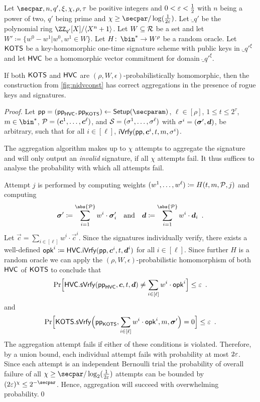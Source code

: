 \begin{lemma}\label{lem:msigaggcorrect}
Let $\secpar,n,q',\xi,\chi,\rho,\tau$ be positive integers and $0 < \varepsilon < \tfrac{1}{2}$ with $n$ being a power of two, $q'$ being prime and $\chi \geq \secpar/\log(\tfrac{1}{2\errorbound})$.
Let $\ring_{q'}$ be the polynomial ring $\defringqq$.
Let $W \subseteq \mathcal{R}$ be a set and let $W' \coloneqq \{w^0-w^1| w^0,w^1 \in W\}$.
Let $H\colon\, \bin^* \to W^\rho$ be a random oracle.
Let $\mathsf{KOTS}$ be a key-homomorphic one-time signature scheme with public keys in $\ring_{q'}^\xi$ and let $\mathsf{HVC}$ be a homomorphic vector commitment for domain $\ring_{q'}^\xi$.

If both $\mathsf{KOTS}$ and $\mathsf{HVC}$ are $(\rho,W,\epsilon)$-probabilistically homomorphic, then the construction from \autoref{fig:nidvconst} has correct aggregations in the presence of rogue keys and signatures.
\end{lemma}
\begin{proof}
  Let $\params = (\params_\hvc,\params_\hots)\gets\setup(\secparam)$, $\ell \in [\rho]$, $1\leq t\leq 2^\tau$, $m\in\bin^*$, $\mathcal{P} = (\boldsymbol{c}^1,\dots,\boldsymbol{c}^\ell)$, and $\mathcal{S} = (\sigma^1,\dots,\sigma^\ell)$ with 
  $\sigma^i=(\boldsymbol{\sigma}',\boldsymbol{d})$, be arbitrary, such that for all $i\in[\ell]$, $\mathsf{iVrfy}(\mathsf{pp},\boldsymbol{c}^i,t,m,\sigma^i)$.
  
  The aggregation algorithm makes up to $\chi$ attempts to aggregate the signature and will only output an \emph{invalid} signature, if all $\chi$ attempts fail.
  It thus suffices to analyse the probability with which all attempts fail.
  
  Attempt $j$ is performed by computing weights $(w^1,\dots,w^\ell) \coloneqq H(t,m,\mathcal{P},j)$ and computing 
  \[
    \otsig \coloneqq \sum_{i=1}^{\abs{\pubkeys}} w^i\cdot \otsig_i \quad \text{and}\quad \vec{d} \coloneqq \sum_{i=1}^{\abs{\pubkeys}} w^i\cdot \vec{d}_i\enspace.
  \]
  Let $\vec{c} = \sum_{i\in[\ell]}w^i\cdot\vec{c}^i$.
  Since the signatures individually verify, there exists a well-defined $\mathsf{opk}^i \coloneqq \mathsf{HVC}.\mathsf{iVrfy}(\mathsf{pp},\boldsymbol{c}^i,t,\boldsymbol{d}^i)$ for all $i\in[\ell]$.
  Since further $H$ is a random oracle we can apply the $(\rho,W,\epsilon)$-probabilistic homomorphism of both $\mathsf{HVC}$ of $\mathsf{KOTS}$ to conclude that
  \[
    \Pr\Bigl[\mathsf{HVC}.\mathsf{sVrfy}(\mathsf{pp}_{\mathsf{HVC}},\boldsymbol{c},t,\boldsymbol{d}) \neq \sum_{i\in[\ell]} w^i\cdot\mathsf{opk}^i\Bigr] \leq \varepsilon \enspace.
  \]
  and
  \[
    \Pr\Bigl[\mathsf{KOTS}.\mathsf{sVrfy}\Bigl(\mathsf{pp}_{\mathsf{KOTS}},\sum_{i\in[\ell]} w^i\cdot\mathsf{opk}^i, m, \boldsymbol{\sigma}'\Bigr) = 0\Bigr] \leq \varepsilon\enspace.
  \]
  The aggregation attempt fails if either of these conditions is violated.
  Therefore, by a union bound, each individual attempt fails with probability at most $2\varepsilon$.
  Since each attempt is an independent Bernoulli trial the probability of overall failure of all $\chi\geq \secpar/\log_2(\tfrac{1}{2\errorbound})$ attempts can be bounded by $(2\errorbound)^{\chi} \leq 2^{-\secpar}$.
  Hence, aggregation will succeed with overwhelming probability.\qed
\end{proof}

